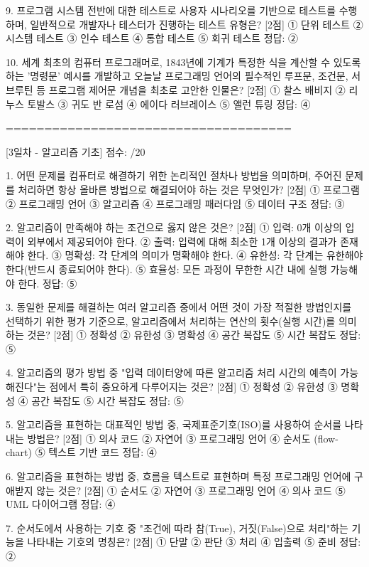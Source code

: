 9. 프로그램 시스템 전반에 대한 테스트로 사용자 시나리오를 기반으로 테스트를 수행하며, 일반적으로 개발자나 테스터가 진행하는 테스트 유형은? [2점]
① 단위 테스트
② 시스템 테스트
③ 인수 테스트
④ 통합 테스트
⑤ 회귀 테스트
정답: ②

10. 세계 최초의 컴퓨터 프로그래머로, 1843년에 기계가 특정한 식을 계산할 수 있도록 하는 '명령문' 예시를 개발하고 오늘날 프로그래밍 언어의 필수적인 루프문, 조건문, 서브루틴 등 프로그램 제어문 개념을 최초로 고안한 인물은? [2점]
① 찰스 배비지
② 리누스 토발스
③ 귀도 반 로섬
④ 에이다 러브레이스
⑤ 앨런 튜링
정답: ④

=====================================

[3일차 - 알고리즘 기초]
점수: /20

1. 어떤 문제를 컴퓨터로 해결하기 위한 논리적인 절차나 방법을 의미하며, 주어진 문제를 처리하면 항상 올바른 방법으로 해결되어야 하는 것은 무엇인가? [2점]
① 프로그램
② 프로그래밍 언어
③ 알고리즘
④ 프로그래밍 패러다임
⑤ 데이터 구조
정답: ③

2. 알고리즘이 만족해야 하는 조건으로 옳지 않은 것은? [2점]
① 입력: 0개 이상의 입력이 외부에서 제공되어야 한다.
② 출력: 입력에 대해 최소한 1개 이상의 결과가 존재해야 한다.
③ 명확성: 각 단계의 의미가 명확해야 한다.
④ 유한성: 각 단계는 유한해야 한다(반드시 종료되어야 한다).
⑤ 효율성: 모든 과정이 무한한 시간 내에 실행 가능해야 한다.
정답: ⑤

3. 동일한 문제를 해결하는 여러 알고리즘 중에서 어떤 것이 가장 적절한 방법인지를 선택하기 위한 평가 기준으로, 알고리즘에서 처리하는 연산의 횟수(실행 시간)를 의미하는 것은? [2점]
① 정확성
② 유한성
③ 명확성
④ 공간 복잡도
⑤ 시간 복잡도
정답: ⑤

4. 알고리즘의 평가 방법 중 "입력 데이터양에 따른 알고리즘 처리 시간의 예측이 가능해진다"는 점에서 특히 중요하게 다루어지는 것은? [2점]
① 정확성
② 유한성
③ 명확성
④ 공간 복잡도
⑤ 시간 복잡도
정답: ⑤

5. 알고리즘을 표현하는 대표적인 방법 중, 국제표준기호(ISO)를 사용하여 순서를 나타내는 방법은? [2점]
① 의사 코드
② 자연어
③ 프로그래밍 언어
④ 순서도 (flow-chart)
⑤ 텍스트 기반 코드
정답: ④

6. 알고리즘을 표현하는 방법 중, 흐름을 텍스트로 표현하며 특정 프로그래밍 언어에 구애받지 않는 것은? [2점]
① 순서도
② 자연어
③ 프로그래밍 언어
④ 의사 코드
⑤ UML 다이어그램
정답: ④

7. 순서도에서 사용하는 기호 중 "조건에 따라 참(True), 거짓(False)으로 처리"하는 기능을 나타내는 기호의 명칭은? [2점]
① 단말
② 판단
③ 처리
④ 입출력
⑤ 준비
정답: ②


